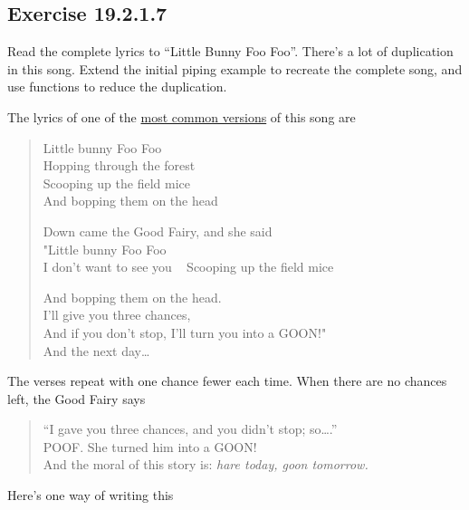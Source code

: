 \documentclass[]{book}
\theoremstyle{plain}
\theoremstyle{remark}
\begin{document}
\hypertarget{exercise-19.2.1.7}{%
\subsection*{\texorpdfstring{Exercise {19.2.1.7}}{Exercise 19.2.1.7}}\label{exercise-19.2.1.7}}

Read the complete lyrics to ``Little Bunny Foo Foo''. There's a lot of duplication in this song. Extend the initial piping example to recreate the complete song, and use functions to reduce the duplication.

The lyrics of one of the \href{https://en.wikipedia.org/wiki/Little_Bunny_Foo_Foo}{most common versions} of this song are

\begin{quote}
Little bunny Foo Foo\\
Hopping through the forest\\
Scooping up the field mice\\
And bopping them on the head

Down came the Good Fairy, and she said\\
"Little bunny Foo Foo\\
I don't want to see you ~
Scooping up the field mice

And bopping them on the head.\\
I'll give you three chances,\\
And if you don't stop, I'll turn you into a GOON!"\\
And the next day\ldots{}
\end{quote}

The verses repeat with one chance fewer each time.
When there are no chances left, the Good Fairy says

\begin{quote}
``I gave you three chances, and you didn't stop; so\ldots{}.''\\
POOF. She turned him into a GOON!\\
And the moral of this story is: \emph{hare today, goon tomorrow.}
\end{quote}

Here's one way of writing this
\end{document}
